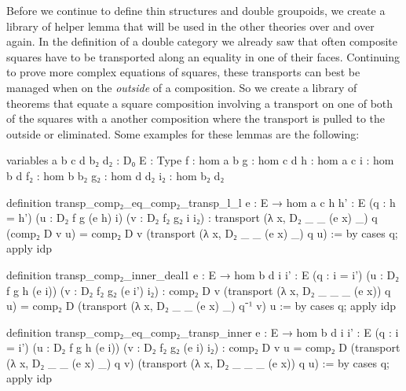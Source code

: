 Before we continue to define thin structures and double groupoids,
we create a library of helper lemma that will be used in the other theories
over and over again.
In the definition of a double category we already saw that often composite
squares have to be transported along an equality in one of their faces.
Continuing to prove more complex equations of squares, these transports can
best be managed when on the \emph{outside} of a composition.
So we create a library of theorems that equate a square composition involving
a transport on one of both of the squares with a another composition where the
transport is pulled to the outside or eliminated.
Some examples for these lemmas are the following:
\begin{leancodebr}
variables {a b c d b₂ d₂ : D₀} {E : Type}
  {f : hom a b} {g : hom c d} {h : hom a c} {i : hom b d}
  {f₂ : hom b b₂} {g₂ : hom d d₂} {i₂ : hom b₂ d₂}

definition transp_comp₂_eq_comp₂_transp_l_l {e : E → hom a c}
  {h h' : E} (q : h = h')
  (u : D₂ f g (e h) i) (v : D₂ f₂ g₂ i i₂) :
  transport (λ x, D₂ _ _ (e x) _) q (comp₂ D v u)
  = comp₂ D v (transport (λ x, D₂ _ _ (e x) _) q u) :=
by cases q; apply idp

definition transp_comp₂_inner_deal1 {e : E → hom b d}
  {i i' : E} (q : i = i')
  (u : D₂ f g h (e i)) (v : D₂ f₂ g₂ (e i') i₂) :
  comp₂ D v (transport (λ x, D₂ _ _ _ (e x)) q u)
  = comp₂ D (transport (λ x, D₂ _ _ (e x) _) q⁻¹ v) u :=
by cases q; apply idp

definition transp_comp₂_eq_comp₂_transp_inner {e : E → hom b d}
  {i i' : E} (q : i = i')
  (u : D₂ f g h (e i)) (v : D₂ f₂ g₂ (e i) i₂) :
  comp₂ D v u = comp₂ D (transport (λ x, D₂ _ _ (e x) _) q v)
    (transport (λ x, D₂ _ _ _ (e x)) q u) :=
by cases q; apply idp
\end{leancodebr}

